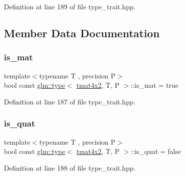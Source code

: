 Definition at line 189 of file type\+\_\+trait.\+hpp.



\subsection{Member Data Documentation}
\mbox{\label{structglm_1_1type_3_01tmat4x2_00_01_t_00_01_p_01_4_aa7e073a165d8540230bcd8bf27514179}} 
\subsubsection{\texorpdfstring{is\_mat}{is\_mat}}
{\footnotesize\ttfamily template$<$typename T , precision P$>$ \\
bool const \mbox{\hyperlink{structglm_1_1type}{glm\+::type}}$<$ \mbox{\hyperlink{structglm_1_1tmat4x2}{tmat4x2}}, T, P $>$\+::is\+\_\+mat = true\hspace{0.3cm}{\ttfamily [static]}}



Definition at line 187 of file type\+\_\+trait.\+hpp.

\mbox{\label{structglm_1_1type_3_01tmat4x2_00_01_t_00_01_p_01_4_aa84a332b30401e37a096b469f44dce09}} 
\subsubsection{\texorpdfstring{is\_quat}{is\_quat}}
{\footnotesize\ttfamily template$<$typename T , precision P$>$ \\
bool const \mbox{\hyperlink{structglm_1_1type}{glm\+::type}}$<$ \mbox{\hyperlink{structglm_1_1tmat4x2}{tmat4x2}}, T, P $>$\+::is\+\_\+quat = false\hspace{0.3cm}{\ttfamily [static]}}



Definition at line 188 of file type\+\_\+trait.\+hpp.

\mbox{\label{structglm_1_1type_3_01tmat4x2_00_01_t_00_01_p_01_4_a501af9781d0bcd0426334f04c96cd5d8}} 
